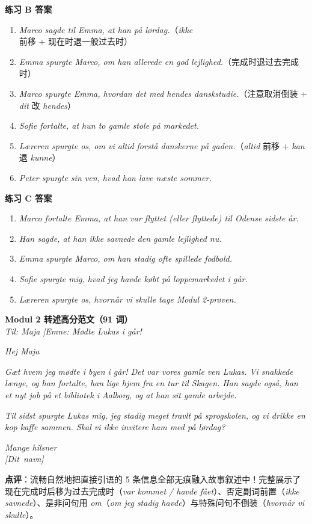 \begin{answerbox}
\textbf{练习 B 答案}
\begin{enumerate}
  \item \textit{Marco sagde til Emma, at han  på lørdag.}（\textit{ikke} 前移 + 现在时退一般过去时）
  \item \textit{Emma spurgte Marco, om han allerede  en god lejlighed.}（完成时退过去完成时）
  \item \textit{Marco spurgte Emma, hvordan det  med hendes danskstudie.}（注意取消倒装 + \textit{dit} 改 \textit{hendes}）
  \item \textit{Sofie fortalte, at hun  to gamle stole på markedet.}
  \item \textit{Læreren spurgte os, om vi altid  forstå danskerne på gaden.}（\textit{altid} 前移 + \textit{kan} 退 \textit{kunne}）
  \item \textit{Peter spurgte sin ven, hvad han  lave næste sommer.}
\end{enumerate}

\textbf{练习 C 答案}
\begin{enumerate}
  \item \textit{Marco fortalte Emma, at han var flyttet (eller flyttede) til Odense sidste år.}
  \item \textit{Han sagde, at han ikke savnede den gamle lejlighed nu.}
  \item \textit{Emma spurgte Marco, om han stadig ofte spillede fodbold.}
  \item \textit{Sofie spurgte mig, hvad jeg havde købt på loppemarkedet i går.}
  \item \textit{Læreren spurgte os, hvornår vi skulle tage Modul 2-prøven.}
\end{enumerate}

\textbf{Modul 2 转述高分范文（91 词）}\\
\textit{Til: Maja \quad|\quad Emne: Mødte Lukas i går!}

\textit{Hej Maja}

\textit{Gæt hvem jeg mødte i byen i går! Det var vores gamle ven Lukas. Vi snakkede længe, og han fortalte,  han lige  hjem fra en tur til Skagen. Han sagde også,  han  et nyt job på et bibliotek i Aalborg, og at han  sit gamle arbejde.}

\textit{Til sidst spurgte Lukas mig,  jeg stadig  meget travlt på sprogskolen, og  vi  drikke en kop kaffe sammen. Skal vi ikke invitere ham med på lørdag?}

\textit{Mange hilsner\\
\mbox{[Dit navn]}}

\small\textbf{点评}：流畅自然地把直接引语的 5 条信息全部无痕融入故事叙述中！完整展示了现在完成时后移为过去完成时（\textit{var kommet / havde fået}）、否定副词前置（\textit{ikke savnede}）、是非问句用 \textit{om}（\textit{om jeg stadig havde}）与特殊问句不倒装（\textit{hvornår vi skulle}）。
\end{answerbox}
